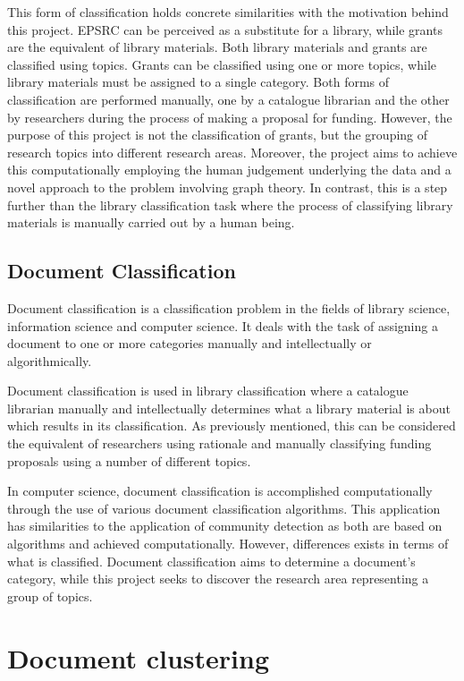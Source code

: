 This form of classification holds concrete similarities with the motivation behind this project. EPSRC can be perceived as a substitute for a library, while grants are the equivalent of library materials. Both library materials and grants are classified using topics. Grants can be classified using one or more topics, while library materials must be assigned to a single category. Both forms of classification are performed manually, one by a catalogue librarian and the other by researchers during the process of making a proposal for funding. However, the purpose of this project is not the classification of grants, but the grouping of research topics into different research areas. Moreover, the project aims to achieve this computationally employing the human judgement underlying the data and a novel approach to the problem involving graph theory. In contrast, this is a step further than the library classification task where the process of classifying library materials is manually carried out by a human being.

\subsection{Document Classification}

Document classification is a classification problem in the fields of library science, information science and computer science. It deals with the task of assigning a document to one or more categories manually and intellectually or algorithmically.

Document classification is used in library classification where a catalogue librarian manually and intellectually determines what a library material is about which results in its classification. As previously mentioned, this can be considered the equivalent of researchers using rationale and manually classifying funding proposals using a number of different topics.

In computer science, document classification is accomplished computationally through the use of various document classification algorithms. This application has similarities to the application of community detection as both are based on algorithms and achieved computationally. However, differences exists in terms of what is classified. Document classification aims to determine a document's category, while this project seeks to discover the research area representing a group of topics.

\section{Document clustering}

